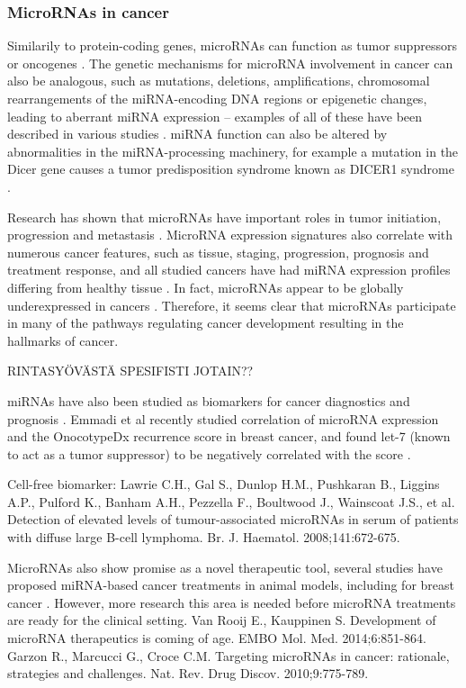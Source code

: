\subsubsection{MicroRNAs in cancer}

Similarily to protein-coding genes, microRNAs can function as tumor
suppressors or oncogenes \citep{Lin2015}. The genetic mechanisms for microRNA
involvement in cancer can also be analogous, such as mutations, deletions,
amplifications, chromosomal rearrangements of the miRNA-encoding DNA regions
or epigenetic changes, leading to aberrant miRNA expression --
examples of all of these have been described in various studies \citep{Calin2006}.
miRNA function can also be altered by abnormalities in the miRNA-processing
machinery, for example a mutation in the Dicer gene causes a tumor
predisposition syndrome known as DICER1 syndrome \citep{Slade2011}.

Research has shown that microRNAs have important roles in tumor initiation,
progression and metastasis \citep{Lin2015}. MicroRNA expression signatures
also correlate with numerous cancer features, such as tissue, staging, 
progression, prognosis and treatment response, and all studied cancers
have had miRNA expression profiles differing from healthy tissue
\citep{Calin2006}. In fact, microRNAs appear to be globally underexpressed in
cancers \citep{Lu2005}. Therefore, it seems clear that microRNAs participate
in many of the pathways regulating cancer development resulting in the hallmarks
of cancer.


RINTASYÖVÄSTÄ SPESIFISTI JOTAIN??


miRNAs have also been studied as biomarkers for cancer diagnostics and prognosis
\citep{}. Emmadi et al recently studied correlation of microRNA expression and the
OnocotypeDx recurrence score in breast cancer, and found let-7 (known to
act as a tumor suppressor) to be negatively correlated with the score \citep{Emmadi2015}.

Cell-free biomarker:
Lawrie C.H., Gal S., Dunlop H.M., Pushkaran B., Liggins A.P., Pulford K., Banham A.H., Pezzella F., Boultwood J., Wainscoat J.S., et al. Detection of elevated levels of tumour-associated microRNAs in serum of patients with diffuse large B-cell lymphoma. Br. J. Haematol. 2008;141:672-675.

MicroRNAs also show promise as a novel therapeutic tool, several
studies have proposed miRNA-based cancer treatments in animal models, including
for breast cancer \citep{}. However, more research this area is needed before
microRNA treatments are ready for the clinical setting.
Van Rooij E., Kauppinen S. Development of microRNA therapeutics is coming of age. EMBO Mol. Med. 2014;6:851-864.
 Garzon R., Marcucci G., Croce C.M. Targeting microRNAs in cancer: rationale, strategies and challenges. Nat. Rev. Drug Discov. 2010;9:775-789.







